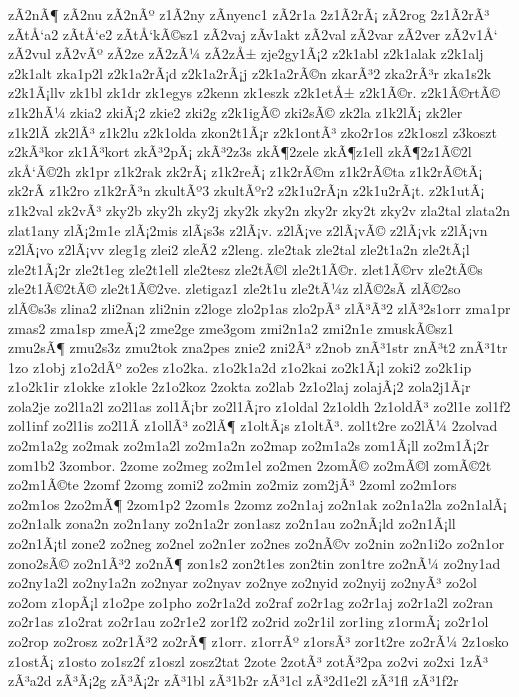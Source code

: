 {zÃ­2nÃ¶
zÃ­2nu
zÃ­2nÃº
z1Ã­2ny
zÃ­nyenc1
zÃ­2r1a
2z1Ã­2rÃ¡
zÃ­2rog
2z1Ã­2rÃ³
zÃ­tÅ‘a2
zÃ­tÅ‘e2
zÃ­tÅ‘kÃ©sz1
zÃ­2vaj
zÃ­v1akt
zÃ­2val
zÃ­2var
zÃ­2ver
zÃ­2v1Å‘
zÃ­2vul
zÃ­2vÃº
zÃ­2ze
zÃ­2zÃ¼
zÃ­2zÅ±
zje2gy1Ã¡2
z2k1abl
z2k1alak
z2k1alj
z2k1alt
zka1p2l
z2k1a2rÃ¡d
z2k1a2rÃ¡j
z2k1a2rÃ©n
zkarÃ³2
zka2rÃ³r
zka1s2k
z2k1Ã¡llv
zk1bl
zk1dr
zk1egys
z2kenn
zk1eszk
z2k1etÅ±
z2k1Ã©r.
z2k1Ã©rtÃ©
z1k2hÃ¼
zkia2
zkiÃ¡2
zkie2
zki2g
z2k1igÃ©
zki2sÃ©
zk2la
z1k2lÃ¡
zk2ler
z1k2lÃ­
zk2lÃ³
z1k2lu
z2k1olda
zkon2t1Ã¡r
z2k1ontÃ³
zko2r1os
z2k1oszl
z3koszt
z2kÃ³kor
zk1Ã³kort
zkÃ³2pÃ¡
zkÃ³2z3s
zkÃ¶2zele
zkÃ¶z1ell
zkÃ¶2z1Ã©2l
zkÅ‘Ã©2h
zk1pr
z1k2rak
zk2rÃ¡
z1k2reÃ¡
z1k2rÃ©m
z1k2rÃ©ta
z1k2rÃ©tÃ¡
zk2rÃ­
z1k2ro
z1k2rÃ³n
zkultÃº3
zkultÃºr2
z2k1u2rÃ¡n
z2k1u2rÃ¡t.
z2k1utÃ¡
z1k2val
zk2vÃ³
zky2b
zky2h
zky2j
zky2k
zky2n
zky2r
zky2t
zky2v
zla2tal
zlata2n
zlat1any
zlÃ¡2m1e
zlÃ¡2mis
zlÃ¡s3s
z2lÃ¡v.
z2lÃ¡ve
z2lÃ¡vÃ©
z2lÃ¡vk
z2lÃ¡vn
z2lÃ¡vo
z2lÃ¡vv
zleg1g
zlei2
zleÃ­2
z2leng.
zle2tak
zle2tal
zle2t1a2n
zle2tÃ¡l
zle2t1Ã¡2r
zle2t1eg
zle2t1ell
zle2tesz
zle2tÃ©l
zle2t1Ã©r.
zlet1Ã©rv
zle2tÃ©s
zle2t1Ã©2tÃ©
zle2t1Ã©2ve.
zletigaz1
zle2t1u
zle2tÃ¼z
zlÃ©2sÃ­
zlÃ©2so
zlÃ©s3s
zlina2
zli2nan
zli2nin
z2loge
zlo2p1as
zlo2pÃ³
zlÃ³Ã³2
zlÃ³2s1orr
zma1pr
zmas2
zma1sp
zmeÃ¡2
zme2ge
zme3gom
zmi2n1a2
zmi2n1e
zmuskÃ©sz1
zmu2sÃ¶
zmu2s3z
zmu2tok
zna2pes
znie2
zni2Ã³
z2nob
znÃ³1str
znÃ³t2
znÃ³1tr
1zo
z1obj
z1o2dÃº
zo2es
z1o2ka.
z1o2k1a2d
z1o2kai
zo2k1Ã¡l
zoki2
zo2k1ip
z1o2k1ir
z1okke
z1okle
2z1o2koz
2zokta
zo2lab
2z1o2laj
zolajÃ¡2
zola2j1Ã¡r
zola2je
zo2l1a2l
zo2l1as
zol1Ã¡br
zo2l1Ã¡ro
z1oldal
2z1oldh
2z1oldÃ³
zo2l1e
zol1f2
zol1inf
zo2l1is
zo2l1Ã­
z1ollÃ³
zo2lÃ¶
z1oltÃ¡s
z1oltÃ³.
zol1t2re
zo2lÃ¼
2zolvad
zo2m1a2g
zo2mak
zo2m1a2l
zo2m1a2n
zo2map
zo2m1a2s
zom1Ã¡ll
zo2m1Ã¡2r
zom1b2
3zombor.
2zome
zo2meg
zo2m1el
zo2men
2zomÃ©
zo2mÃ©l
zomÃ©2t
zo2m1Ã©te
2zomf
2zomg
zomi2
zo2min
zo2miz
zom2jÃ³
2zoml
zo2m1ors
zo2m1os
2zo2mÃ¶
2zom1p2
2zom1s
2zomz
zo2n1aj
zo2n1ak
zo2n1a2la
zo2n1alÃ¡
zo2n1alk
zona2n
zo2n1any
zo2n1a2r
zon1asz
zo2n1au
zo2nÃ¡ld
zo2n1Ã¡ll
zo2n1Ã¡tl
zone2
zo2neg
zo2nel
zo2n1er
zo2nes
zo2nÃ©v
zo2nin
zo2n1i2o
zo2n1or
zono2sÃ©
zo2n1Ã³2
zo2nÃ¶
zon1s2
zon2t1es
zon2tin
zon1tre
zo2nÃ¼
zo2ny1ad
zo2ny1a2l
zo2ny1a2n
zo2nyar
zo2nyav
zo2nye
zo2nyid
zo2nyij
zo2nyÃ³
zo2ol
zo2om
z1opÃ¡l
z1o2pe
zo1pho
zo2r1a2d
zo2raf
zo2r1ag
zo2r1aj
zo2r1a2l
zo2ran
zo2r1as
z1o2rat
zo2r1au
zo2r1e2
zor1f2
zo2rid
zo2r1il
zor1ing
z1ormÃ¡
zo2r1ol
zo2rop
zo2rosz
zo2r1Ã³2
zo2rÃ¶
z1orr.
z1orrÃº
z1orsÃ³
zor1t2re
zo2rÃ¼
2z1osko
z1ostÃ¡
z1osto
zo1sz2f
z1oszl
zosz2tat
2zote
2zotÃ³
zotÃ³2pa
zo2vi
zo2xi
1zÃ³
zÃ³a2d
zÃ³Ã¡2g
zÃ³Ã¡2r
zÃ³1bl
zÃ³1b2r
zÃ³1cl
zÃ³2d1e2l
zÃ³1fl
zÃ³1f2r
}
